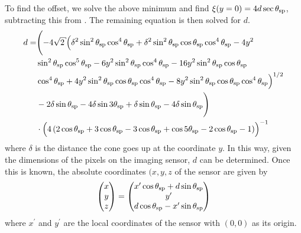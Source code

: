 To find the offset, we solve the above minimum and find $\xi(y=0) = 4 d
\sec\theta_\mathrm{sp}$, subtracting this from .  The remaining
equation is then solved for $d$.
\begin{align}
d =& \Biggl(-4 \sqrt{2} \Bigl(\delta^2 \sin ^2\thetasp \cos
^4\thetasp+\delta^2 \sin ^2\thetasp \cos \thetasp \cos ^4\thetasp-4 y^2 \nonumber \\
   & \sin ^2\thetasp \cos ^5\thetasp-6 y^2 \sin ^2\thetasp
     \cos ^4\thetasp-16 y^2 \sin ^2\thetasp \cos \thetasp \nonumber \\
  & \cos ^4\thetasp+4 y^2 \sin ^2\thetasp \cos \thetasp
    \cos ^4\thetasp-8 y^2 \sin ^2\thetasp \cos \thetasp \cos
    ^4\thetasp\Bigr)^{1/2} \nonumber \\
&-2 \delta\sin \thetasp-4 \delta \sin 3 \thetasp+\delta  \sin \thetasp-4 \delta \sin \thetasp\Biggr) \nonumber \\
&\cdot\Bigl(4 \left(2 \cos \thetasp+3 \cos \thetasp-3 \cos \thetasp+\cos 5 \thetasp-2 \cos \thetasp-1\right)\Bigr)^{-1}
\end{align}
where $\delta$ is the distance the cone goes up at the coordinate $y$.  
In this way, given the dimensions of the pixels on the imaging sensor, $d$
can be determined.  Once this is known, the absolute coordinates $(x,y,z$ of the
sensor are given by 
\begin{equation}
	\begin{pmatrix} 
					x\\ 
					y\\ 
					z
	\end{pmatrix} 
	=
	\begin{pmatrix} 
					x^\prime \cos\theta_\mathrm{sp} + d \sin\theta_\mathrm{sp}\\ 
					y^\prime \\
					d \cos\theta_\mathrm{sp} - x^\prime \sin\theta_\mathrm{sp}\\ 
	\end{pmatrix} 
\label{eqn:sensorcoordinates}
\end{equation}
where $x^\prime$ and $y^\prime$ are the local coordinates of the sensor
with $(0,0)$ as its origin.  
